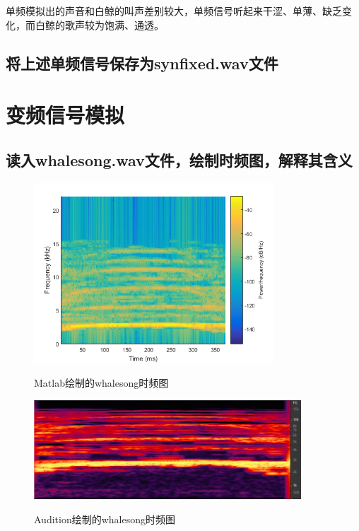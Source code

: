 \documentclass{article}
\begin{document}
            单频模拟出的声音和白鲸的叫声差别较大，单频信号听起来干涩、单薄、缺乏变化，而白鲸的歌声较为饱满、通透。
            
        \subsection{将上述单频信号保存为synfixed.wav文件}
    
    \section{变频信号模拟}
        \subsection{读入whalesong.wav文件，绘制时频图，解释其含义}
            \begin{figure}[htb]
                \centering
                \includegraphics[width=9cm]{figure5.png}
                \label{fig:originft-1}\caption{Matlab绘制的whalesong时频图}
            \end{figure}
            
            \begin{figure}[!htb]
                \centering
                \includegraphics[width=10cm]{figure6.png}
                \label{fig:originft-2}\caption{Audition绘制的whalesong时频图}
            \end{figure}
            
\end{document}
